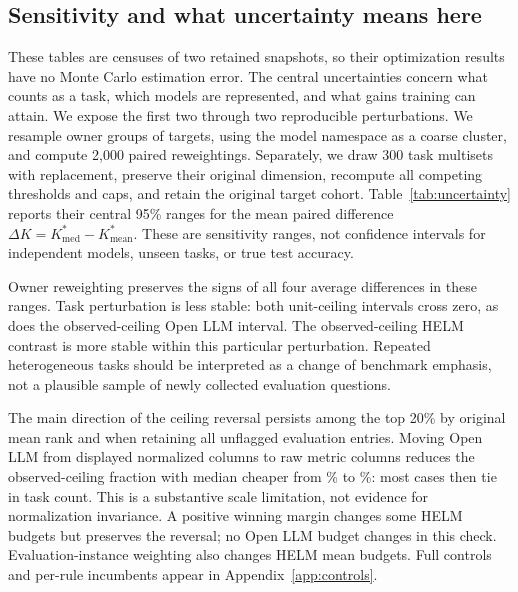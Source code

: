 \documentclass{article}
\newcommand{\mean}{\mathrm{mean}}
\newcommand{\med}{\mathrm{med}}
\begin{document}
\subsection{Sensitivity and what uncertainty means here}
\label{sec:uncertainty}
These tables are censuses of two retained snapshots, so their optimization results
have no Monte Carlo estimation error. The central uncertainties concern what
counts as a task, which models are represented, and what gains training can attain.
We expose the first two through two reproducible perturbations. We resample owner
groups of targets, using the model namespace as a coarse cluster, and compute
2,000 paired reweightings. Separately, we draw 300 task multisets with replacement,
preserve their original dimension, recompute all competing thresholds and caps,
and retain the original target cohort. Table~\ref{tab:uncertainty} reports their
central 95\% ranges for the mean paired difference $\Delta K=K^*_\med-K^*_\mean$.
These are sensitivity ranges, not confidence intervals for independent models,
unseen tasks, or true test accuracy.

\begin{table}[t]
\centering\small\setlength{\tabcolsep}{4pt}

\caption{Paired task-count difference as a percentage of panel dimension.
Positive means median costs more. Owner reweighting and task resampling are
different perturbations of a finite table, not statistical evidence about a
random population.}
\label{tab:uncertainty}
\end{table}

Owner reweighting preserves the signs of all four average differences in these
ranges. Task perturbation is less stable: both unit-ceiling intervals cross zero,
as does the observed-ceiling Open LLM interval. The observed-ceiling HELM contrast
is more stable within this particular perturbation. Repeated heterogeneous tasks
should be interpreted as a change of benchmark emphasis, not a plausible sample
of newly collected evaluation questions.

The main direction of the ceiling reversal persists among the top 20\% by original
mean rank and when retaining all unflagged evaluation entries. Moving Open LLM
from displayed normalized columns to raw metric columns reduces the observed-ceiling
fraction with median cheaper from \OllObservedMedLess\% to \OllRawObservedMedLess\%: most cases
then tie in task count. This is a substantive scale limitation, not evidence for
normalization invariance. A positive winning margin changes some HELM budgets
but preserves the reversal; no Open LLM budget changes in this check.
Evaluation-instance weighting also changes HELM mean budgets. Full controls and
per-rule incumbents appear in Appendix~\ref{app:controls}.
\end{document}
